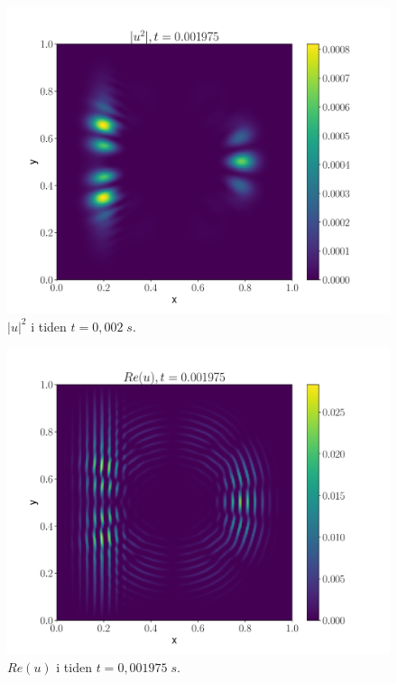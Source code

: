 \documentclass[reprint,english,notitlepage]{revtex4-2}  %
\begin{document}
\begin{figure}[H]
	\centering
	\includegraphics[scale=0.45, trim={3cm 0 0 0}]{../Images/ImshowUt0001975sl2.pdf}
	\caption{$|u|^2 $ i tiden $t = 0,002 \; s$.}
	\label{Fig:s2u2t02}
\end{figure}

\begin{figure}[H]
	\centering
	\includegraphics[scale=0.45, trim={3cm 0 0 0}]{../Images/ImshowRe0001975sl2.pdf}
	\caption{$Re(u) $ i tiden $t = 0,001975 \; s$.}
	\label{Fig:s2Ret02}
\end{figure}
\end{document}
